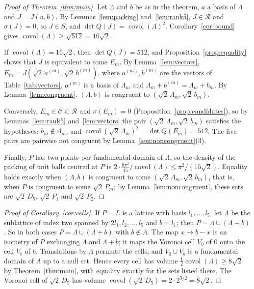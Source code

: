 \documentclass[11pt]{amsart}
\theoremstyle{definition}
\theoremstyle{remark}
\numberwithin{equation}{section}
\numberwithin{table}{section}
\numberwithin{figure}{section}
\newcommand{\Rk}{\mathcal{R}}
\newcommand{\covol}{\operatorname{covol}}
\newcommand{\cand}{\mathcal{C}}
\begin{document}
\begin{proof}[Proof of Theorem~\ref{thm:main}]
Let $\Lambda$ and $b$ be as in the theorem, $a$ a basis of $\Lambda$ and $J=J(a,b)$. By Lemmas~\ref{lem:packing} and~\ref{lem:rank5}, $J\in\Rk$ and $\sigma(J)=0$, so $J\in S$, and $\det Q(J)=\covol(\Lambda)^2$. Corollary~\ref{cor:bound} gives $\covol(\Lambda)\ge\sqrt{512}=16\sqrt2$.

If $\covol(\Lambda)=16\sqrt2$, then $\det Q(J)=512$, and Proposition~\ref{prop:equality} shows that $J$ is equivalent to some $E_m$. By Lemma~\ref{lem:vectors}, $E_m=J(\sqrt2\,a^{(m)},\sqrt2\,b^{(m)})$, where $a^{(m)},b^{(m)}$ are the vectors of Table~\ref{tab:vectors}, $a^{(m)}$ is a basis of $\Lambda_m$ and $\Lambda_m+b^{(m)}=\Lambda_m+b_m$. By Lemma~\ref{lem:congruent}, $(\Lambda,b)$ is congruent to $(\sqrt2\,\Lambda_m,\sqrt2\,b_m)$.

Conversely, $E_m\in\cand\subset\Rk$ and $\sigma(E_m)=0$ (Proposition~\ref{prop:candidates}), so by Lemmas~\ref{lem:rank5} and~\ref{lem:vectors} the pair $(\sqrt2\,\Lambda_m,\sqrt2\,b_m)$ satisfies the hypotheses: $b_m\notin\Lambda_m$, and $\covol(\sqrt2\,\Lambda_m)^2=\det Q(E_m)=512$. The five pairs are pairwise not congruent by Lemma~\ref{lem:noncongruent}(3).

Finally, $P$ has two points per fundamental domain of $\Lambda$, so the density of the packing of unit balls centred at $P$ is $2\cdot\frac{8\pi^2}{15}/\covol(\Lambda)\le\pi^2/(15\sqrt2)$. Equality holds exactly when $(\Lambda,b)$ is congruent to some $(\sqrt2\,\Lambda_m,\sqrt2\,b_m)$, that is, when $P$ is congruent to some $\sqrt2\,P_m$; by Lemma~\ref{lem:noncongruent}, these sets are $\sqrt2\,D_5$, $\sqrt2\,P_1$ and $\sqrt2\,P_2$.
\end{proof}

\begin{proof}[Proof of Corollary~\ref{cor:cells}]
If $P=L$ is a lattice with basis $l_1,\dots,l_5$, let $\Lambda$ be the sublattice of index two spanned by $2l_1,l_2,\dots,l_5$ and $b=l_1$; then $P=\Lambda\cup(\Lambda+b)$. So in both cases $P=\Lambda\cup(\Lambda+b)$ with $b\notin\Lambda$. The map $x\mapsto b-x$ is an isometry of $P$ exchanging $\Lambda$ and $\Lambda+b$; it maps the Voronoi cell $V_0$ of $0$ onto the cell $V_b$ of $b$. Translations by $\Lambda$ permute the cells, and $V_0\cup V_b$ is a fundamental domain of $\Lambda$ up to a null set. Hence every cell has volume $\frac12\covol(\Lambda)\ge8\sqrt2$ by Theorem~\ref{thm:main}, with equality exactly for the sets listed there. The Voronoi cell of $\sqrt2\,D_5$ has volume $\covol(\sqrt2\,D_5)=2\cdot2^{5/2}=8\sqrt2$.
\end{proof}
\end{document}
